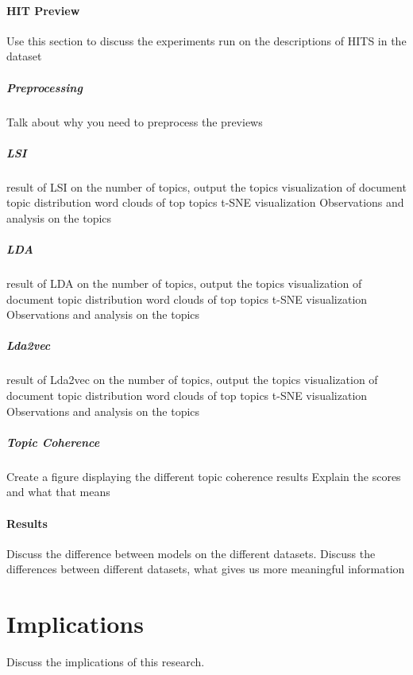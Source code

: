 \documentclass[letterpaper,12pt]{article}
\begin{document}
\subsubsection{HIT Preview}
Use this section to discuss the experiments run on the descriptions of HITS in the dataset

\paragraph{Preprocessing}
Talk about why you need to preprocess the previews
\paragraph{LSI}
result of LSI on the number of topics, output the topics
visualization of document topic distribution
word clouds of top topics
t-SNE visualization
Observations and analysis on the topics

\paragraph{LDA}
result of LDA on the number of topics, output the topics
visualization of document topic distribution
word clouds of top topics
t-SNE visualization
Observations and analysis on the topics

\paragraph{Lda2vec}
result of Lda2vec on the number of topics, output the topics
visualization of document topic distribution
word clouds of top topics
t-SNE visualization
Observations and analysis on the topics

\paragraph{Topic Coherence}
Create a figure displaying the different topic coherence results
Explain the scores and what that means

\subsubsection{Results}
Discuss the difference between models on the different datasets.
Discuss the differences between different datasets, what gives us more meaningful information



\chapter{Implications}
Discuss the implications of this research.
\end{document}
